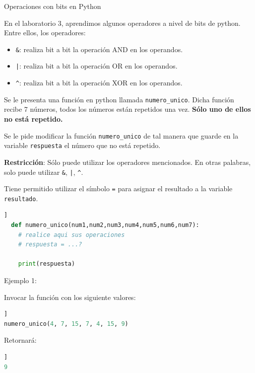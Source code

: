 \documentclass[12pt]{exam}
\begin{document}
\begin{questions}
\begin{table}[h]
{\begin{tabular}{|p{0.2\linewidth}|p{0.2\linewidth}|p{0.2\linewidth}|p{0.2\linewidth}|p{0.2\linewidth}|}
    \hline

    \end{tabular}
  }
\end{table}

\newpage

\question[5] Operaciones con bits en Python

En el laboratorio 3, aprendimos algunos operadores a nivel de bits de python. Entre ellos, los operadores:

\begin{itemize}
  \item \lstinline{&}: realiza bit a bit la operación AND en los operandos.
  \item \lstinline{|}: realiza bit a bit la operación OR en los operandos.
  \item \lstinline{^}: realiza bit a bit la operación XOR en los operandos.
\end{itemize}

Se le presenta una función en python llamada \lstinline{numero_unico}. Dicha función recibe 7 números, todos los números están repetidos una vez. \textbf{Sólo uno de ellos no está repetido.}

Se le pide modificar la función \lstinline{numero_unico} de tal manera que guarde en la variable \lstinline{respuesta} el número que no está repetido.

\textbf{Restricción}: Sólo puede utilizar los operadores mencionados. En otras palabras, solo puede utilizar \lstinline{&}, \lstinline{|}, \lstinline{^}.

Tiene permitido utilizar el símbolo \lstinline{=} para asignar el resultado a la variable \lstinline{resultado}.

\begin{lstlisting}[frame = single, language=python, caption=Funcion numero\_unico]]
  def numero_unico(num1,num2,num3,num4,num5,num6,num7):
    # realice aqui sus operaciones
    # respuesta = ...?
    
    print(respuesta)
\end{lstlisting}

Ejemplo 1:

Invocar la funci\'on con los siguiente valores:

\begin{lstlisting}[frame = single, language=python, caption=Ejemplo 1]]
numero_unico(4, 7, 15, 7, 4, 15, 9)
\end{lstlisting}

Retornar\'a:
\begin{lstlisting}[frame = single, language=python, caption=Output 1]]
9
\end{lstlisting}


\end{questions}
\end{document}
